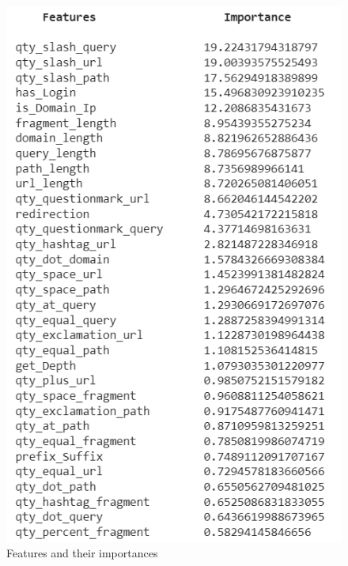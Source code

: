 \begin{figure}[H]
\centerline{\includegraphics[scale=0.8]{featImp1.png}}
\caption{Features and their importances}
\label{fig}
\end{figure}

